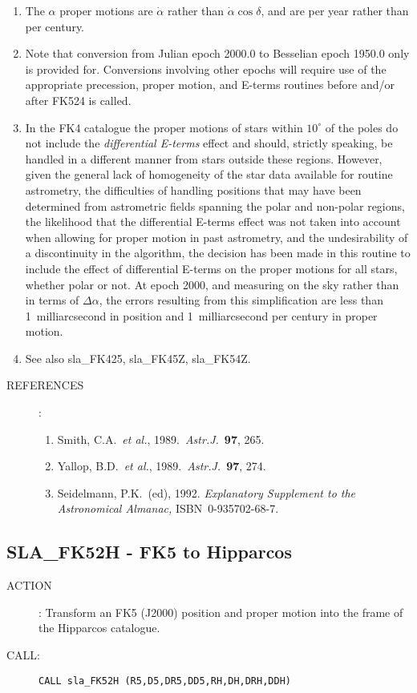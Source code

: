 \documentclass[11pt,twoside]{article}
\newcommand{\xlabel}[1]{}
\newcommand{\routine}[3]
{\hbadness=10000
  \vbox
  {
    \rule{\textwidth}{0.3mm}\\
    {\Large {\bf #1} \hfill #2 \hfill {\bf #1}}\\
    \setlength{\oldspacing}{\topsep}
    \setlength{\topsep}{0.3ex}
    \begin{description}
      #3
    \end{description}
    \setlength{\topsep}{\oldspacing}
  }
}
\renewcommand{\routine}[3]
   {
      \subsection{#1\xlabel{#1} - #2\label{#1}}
       \begin{description}
         #3
       \end{description}
   }
\newcommand{\action}[1]
{\item[ACTION]: #1}
\newcommand{\action}[1]
   {\item[ACTION:] #1}
\newcommand{\call}[1]
{\item[CALL]: \hspace{0.4em}{\tt #1}}
\newlength{\oldspacing}
\renewcommand{\call}[1]
   {
    \item[CALL:] {\tt #1}
   }
\newcommand{\refs}[1]
{
  \goodbreak
  \setlength{\oldspacing}{\topsep}
  \setlength{\topsep}{0.3ex}
  \begin{description}
    \item[REFERENCES]:
        #1
  \end{description}
  \setlength{\topsep}{\oldspacing}
}
\newcommand{\refs}[1]
   {
     \begin{description}
       \item[REFERENCES:]
           #1
     \end{description}
   }
\begin{document}
{
 \begin{enumerate}
  \item The $\alpha$ proper motions are $\dot{\alpha}$ rather than
        $\dot{\alpha}\cos\delta$, and are per year rather than per century.
  \item Note that conversion from Julian epoch 2000.0 to Besselian
        epoch 1950.0 only is provided for.  Conversions involving
        other epochs will require use of the appropriate precession,
        proper motion, and E-terms routines before and/or after
        FK524 is called.
  \item In the FK4 catalogue the proper motions of stars within
        $10^{\circ}$ of the poles do not include the {\it differential
        E-terms}\/ effect and should, strictly speaking, be handled
        in a different manner from stars outside these regions.
        However, given the general lack of homogeneity of the star
        data available for routine astrometry, the difficulties of
        handling positions that may have been determined from
        astrometric fields spanning the polar and non-polar regions,
        the likelihood that the differential E-terms effect was not
        taken into account when allowing for proper motion in past
        astrometry, and the undesirability of a discontinuity in
        the algorithm, the decision has been made in this routine to
        include the effect of differential E-terms on the proper
        motions for all stars, whether polar or not.  At epoch 2000,
        and measuring on the sky rather than in terms of $\Delta\alpha$,
        the errors resulting from this simplification are less than
        1~milliarcsecond in position and 1~milliarcsecond per
        century in proper motion.
  \item See also sla\_FK425, sla\_FK45Z, sla\_FK54Z.
 \end{enumerate}
}
\refs
{
 \begin{enumerate}
  \item Smith, C.A.\ {\it et al.}, 1989.\  {\it Astr.J.}\ {\bf 97}, 265.
  \item Yallop, B.D.\ {\it et al.}, 1989.\ {\it Astr.J.}\ {\bf 97}, 274.
  \item Seidelmann, P.K.\ (ed), 1992.  {\it Explanatory
        Supplement to the Astronomical Almanac,}\/ ISBN~0-935702-68-7.
 \end{enumerate}
}
\routine{SLA\_FK52H}{FK5 to Hipparcos}
{
 \action{Transform an FK5 (J2000) position and proper motion
         into the frame of the Hipparcos catalogue.}
 \call{CALL sla\_FK52H (R5,D5,DR5,DD5,RH,DH,DRH,DDH)}
}
\end{document}
